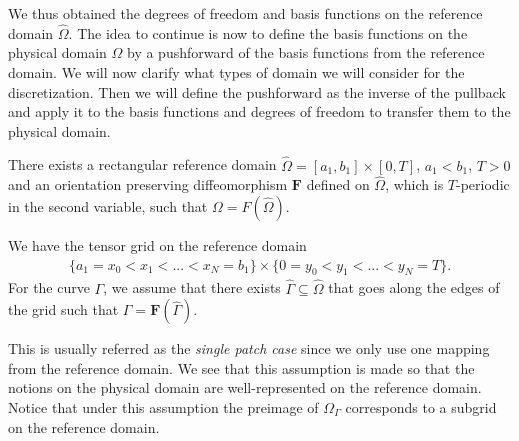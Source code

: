 \documentclass[../master_thesis.tex]{subfiles}
\begin{document}
We thus obtained the degrees of freedom and basis functions on the reference domain $\hat{\Omega}$. The idea 
to continue is now
to define the basis functions on the physical domain $\Omega$ by a 
pushforward of the basis functions from the reference domain. We will now clarify what 
types of domain we will consider for the discretization. Then we will define the pushforward 
as the inverse of the pullback and apply it to the basis functions and degrees of freedom 
to transfer them to the physical domain.

\begin{assumption}\label{ass:discretizable_single_patch_domain}
    There exists a rectangular reference domain $\hat{\Omega} = [a_1, b_1] \times [0, T]$,
    $a_1 < b_1$, $T>0$ 
    and an orientation preserving diffeomorphism $\mathbf{F}$ defined on $\hat{\Omega}$, which is $T$-periodic 
    in the second variable, such that
    $\Omega = F(\hat{\Omega})$. 
    
    We have the tensor grid on the reference domain
    \begin{align*}
        \{a_1 = x_0 < x_1 < ... < x_N = b_1\} \times \{0 = y_0 < y_1 < ... < y_N = T\}.
    \end{align*}
    For the curve $\Gamma$, we assume that there exists $\hat{\Gamma} \subseteq \hat{\Omega}$ 
    that goes along the edges of the grid such that $\Gamma = \mathbf{F}(\hat{\Gamma})$.
\end{assumption}

This is usually referred as the \textit{single patch case} since we only use 
one mapping from the reference domain. We see that this assumption is made so that 
the notions on the physical domain are well-represented on the reference 
domain. Notice that under this assumption the preimage of $\Omega_\Gamma$ corresponds to 
a subgrid on the reference domain. 
\end{document}
